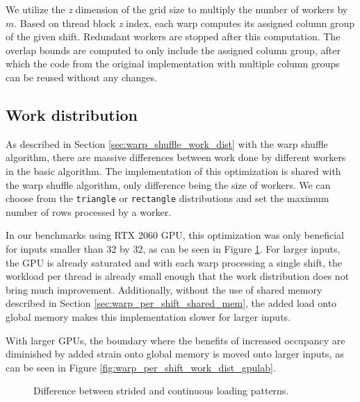 We utilize the \textit{z} dimension of the grid size to multiply the number of workers by $m$. Based on thread block \textit{z} index, each warp computes its assigned column group of the given shift. Redundant workers are stopped after this computation. The overlap bounds are computed to only include the assigned column group, after which the code from the original implementation with multiple column groups can be reused without any changes.

\subsection{Work distribution}

As described in Section \ref{sec:warp_shuffle_work_dist} with the warp shuffle algorithm, there are massive differences between work done by different workers in the basic algorithm. The implementation of this optimization is shared with the warp shuffle algorithm, only difference being the size of workers. We can choose from the \texttt{triangle} or \texttt{rectangle} distributions and set the maximum number of rows processed by a worker.

In our benchmarks using RTX 2060 GPU, this optimization was only beneficial for inputs smaller than 32 by 32, as can be seen in Figure \ref{fig:warp_per_shift_work_dist_local_results}. For larger inputs, the GPU is already saturated and with each warp processing a single shift, the workload per thread is already small enough that the work distribution does not bring much improvement. Additionally, without the use of shared memory described in Section \ref{sec:warp_per_shift_shared_mem}, the added load onto global memory makes this implementation slower for larger inputs.

With larger GPUs, the boundary where the benefits of increased occupancy are diminished by added strain onto global memory is moved onto larger inputs, as can be seen in Figure \ref{fig:warp_per_shift_work_dist_gpulab}. %


\begin{figure}[ht]
	\centering
	\def\svgwidth{0.6\textwidth}
	
	\caption{Difference between strided and continuous loading patterns.}
	\label{fig:warp_per_shift_work_dist_local_results}
\end{figure}



